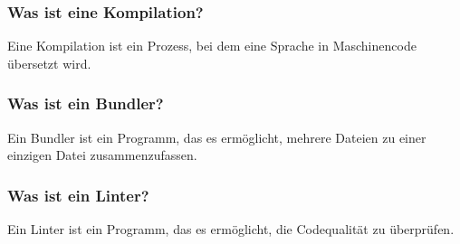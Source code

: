 \subsubsection{Was ist eine Kompilation?}
Eine Kompilation ist ein Prozess, bei dem eine Sprache in Maschinencode übersetzt wird.
\subsubsection{Was ist ein Bundler?}
Ein Bundler ist ein Programm, das es ermöglicht, mehrere Dateien zu einer einzigen Datei zusammenzufassen.
\subsubsection{Was ist ein Linter?}
Ein Linter ist ein Programm, das es ermöglicht, die Codequalität zu überprüfen.
